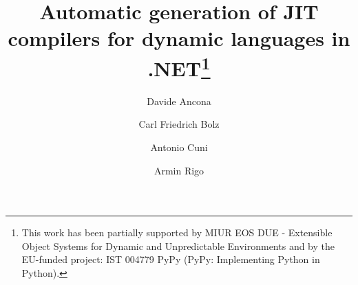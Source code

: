 \documentclass{llncs}
\newcommand{\commentout}[1]{}
\begin{document}
\title{Automatic generation of JIT compilers for dynamic languages
  in .NET\thanks{This work has been partially
supported by MIUR EOS DUE - Extensible Object Systems for Dynamic and
Unpredictable Environments and by the EU-funded project: IST 004779 PyPy
(PyPy: Implementing Python in Python).}}


\author{Davide Ancona \and Carl Friedrich Bolz \and Antonio Cuni \and Armin Rigo}


\maketitle

\commentout{
\section{Tentative structure}
\begin{itemize}
  \item Introduction \& background; main contributions:
    \begin{itemize}
      \item Promotion
      \item (unboxing)
      \item JIT layering
    \end{itemize}
  \item How the generated JITs work
    \begin{itemize}
      \item Promotion: allows intermixing compile-time and runtime; how to
        compare with polymorphic inline caches and partial evaluation
      \item unboxing: how they compare with tracing JITs
      \item (don't talk about merging)
    \end{itemize}
  \item .NET backend
  \item How the JIT generator works
  \item Benchmarks (TLC)
  \item Future works
  \item Conclusions
\end{itemize}
}    












\end{document}
